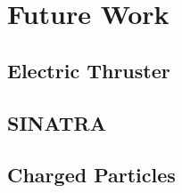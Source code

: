 \section{Future Work}
\subsection{Electric Thruster}
\subsection{SINATRA}
\subsection{Charged Particles}